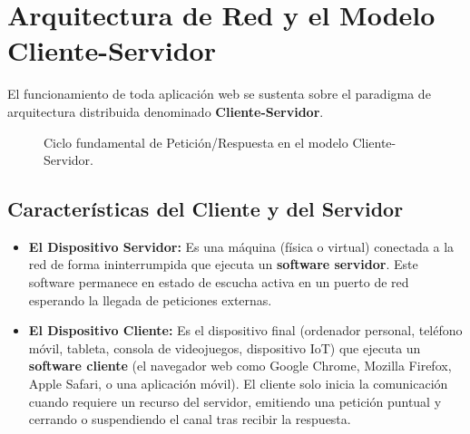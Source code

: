 \section{Arquitectura de Red y el Modelo Cliente-Servidor}

El funcionamiento de toda aplicación web se sustenta sobre el paradigma de arquitectura distribuida denominado \textbf{Cliente-Servidor}.

\begin{figure}[htbp]
\centering
{}
\caption{Ciclo fundamental de Petición/Respuesta en el modelo Cliente-Servidor.}
\label{fig:cliente-servidor-basico}
\end{figure}

\subsection{Características del Cliente y del Servidor}

\begin{itemize}[leftmargin=1.2cm]
  \item \textbf{El Dispositivo Servidor:} Es una máquina (física o virtual) conectada a la red de forma ininterrumpida que ejecuta un \textbf{software servidor}. Este software permanece en estado de escucha activa en un puerto de red esperando la llegada de peticiones externas.
  \item \textbf{El Dispositivo Cliente:} Es el dispositivo final (ordenador personal, teléfono móvil, tableta, consola de videojuegos, dispositivo IoT) que ejecuta un \textbf{software cliente} (el navegador web como Google Chrome, Mozilla Firefox, Apple Safari, o una aplicación móvil). El cliente solo inicia la comunicación cuando requiere un recurso del servidor, emitiendo una petición puntual y cerrando o suspendiendo el canal tras recibir la respuesta.
\end{itemize}

